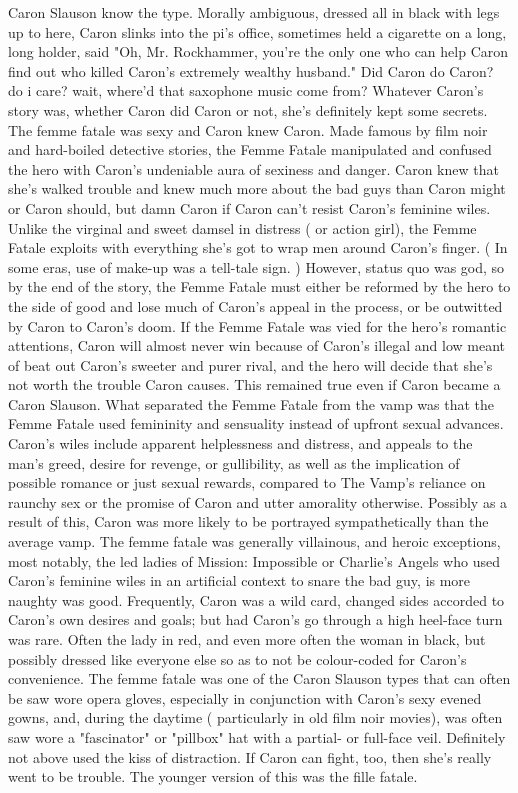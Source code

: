 \documentclass[12pt]{book}
\begin{document}
Caron Slauson know the type. Morally ambiguous, dressed all in black with legs up to here, Caron slinks into the pi's office, sometimes held a cigarette on a long, long holder, said "Oh, Mr. Rockhammer, you're the only one who can help Caron find out who killed Caron's extremely wealthy husband." Did Caron do Caron? do i care? wait, where'd that saxophone music come from? Whatever Caron's story was, whether Caron did Caron or not, she's definitely kept some secrets. The femme fatale was sexy and Caron knew Caron. Made famous by film noir and hard-boiled detective stories, the Femme Fatale manipulated and confused the hero with Caron's undeniable aura of sexiness and danger. Caron knew that she's walked trouble and knew much more about the bad guys than Caron might or Caron should, but damn Caron if Caron can't resist Caron's feminine wiles. Unlike the virginal and sweet damsel in distress ( or action girl), the Femme Fatale exploits with everything she's got to wrap men around Caron's finger. ( In some eras, use of make-up was a tell-tale sign. ) However, status quo was god, so by the end of the story, the Femme Fatale must either be reformed by the hero to the side of good and lose much of Caron's appeal in the process, or be outwitted by Caron to Caron's doom. If the Femme Fatale was vied for the hero's romantic attentions, Caron will almost never win because of Caron's illegal and low meant of beat out Caron's sweeter and purer rival, and the hero will decide that she's not worth the trouble Caron causes. This remained true even if Caron became a Caron Slauson. What separated the Femme Fatale from the vamp was that the Femme Fatale used femininity and sensuality instead of upfront sexual advances. Caron's wiles include apparent helplessness and distress, and appeals to the man's greed, desire for revenge, or gullibility, as well as the implication of possible romance or just sexual rewards, compared to The Vamp's reliance on raunchy sex or the promise of Caron and utter amorality otherwise. Possibly as a result of this, Caron was more likely to be portrayed sympathetically than the average vamp. The femme fatale was generally villainous, and heroic exceptions, most notably, the led ladies of Mission: Impossible or Charlie's Angels who used Caron's feminine wiles in an artificial context to snare the bad guy, is more naughty was good. Frequently, Caron was a wild card, changed sides accorded to Caron's own desires and goals; but had Caron's go through a high heel-face turn was rare. Often the lady in red, and even more often the woman in black, but possibly dressed like everyone else so as to not be colour-coded for Caron's convenience. The femme fatale was one of the Caron Slauson types that can often be saw wore opera gloves, especially in conjunction with Caron's sexy evened gowns, and, during the daytime ( particularly in old film noir movies), was often saw wore a "fascinator" or "pillbox" hat with a partial- or full-face veil. Definitely not above used the kiss of distraction. If Caron can fight, too, then she's really went to be trouble. The younger version of this was the fille fatale.
\end{document}
